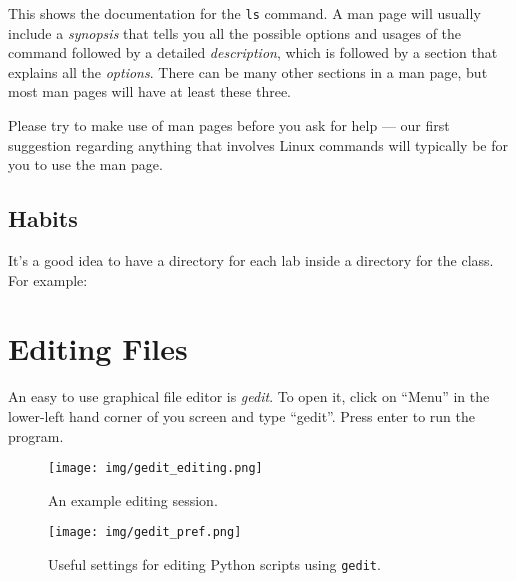 \documentclass[11pt]{cselabheader}
\begin{document}
This shows the documentation for the \texttt{ls} command. A man page will
usually include a \textit{synopsis} that tells you all the possible
options and usages of the command followed by a detailed
\textit{description}, which is followed by a section that explains all
the \textit{options}. There can be many other sections in a man page,
but most man pages will have at least these three.

Please try to make use of man pages before you ask for help --- our first
suggestion regarding anything that involves Linux commands will typically be
for you to use the man page.

\subsection{Habits}
It's a good idea to have a directory for each lab inside a directory for the
class. For example:


\section{Editing Files}

An easy to use graphical file editor is \textit{gedit}.
To open it, click on ``Menu'' in the lower-left hand corner of
you screen and type ``gedit''. Press enter to run the program.

\begin{multicols}{2} 
\begin{figure}[H]
  \centering
  \texttt{[image: img/gedit\_editing.png]}
  \caption{An example editing session.}
\end{figure}
\begin{figure}[H]
  \centering
  \texttt{[image: img/gedit\_pref.png]}
  \caption{Useful settings for editing Python scripts using \texttt{gedit}.}
\end{figure}
\end{multicols}
\end{document}
